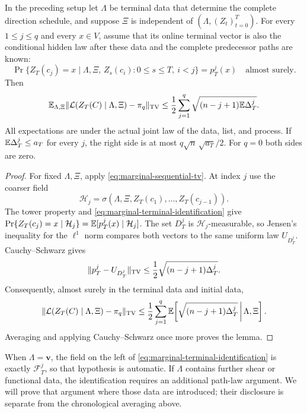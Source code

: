 \begin{lemma}
\label{shear:lem:tuple}
In the preceding setup let $\Lambda$ be terminal data that
determine the complete direction schedule, and suppose $\Xi$ is
independent of $(\Lambda,(Z_t)_{t=0}^T)$. For every
$1\le j\le q$ and every $x\in V$, assume
that its online terminal vector is also the conditional hidden
law after these data and the complete predecessor paths are known:
\begin{equation}\label{eq:marginal-terminal-identification}
 \Pr\{Z_T(c_j)=x\mid
       \Lambda,\Xi,\,
       Z_s(c_i):0\le s\le T,\ i<j\}
 =p_T^j(x)\quad\text{almost surely}.
\end{equation}
Then
\begin{equation}\label{shear:eq:tuple-bound}
 \mathbb E_{\Lambda,\Xi}
 \|\mathcal L(Z_T(C)\mid\Lambda,\Xi)-\pi_q\|_{\mathrm{TV}}
 \le\frac12\sum_{j=1}^q
       \sqrt{(n-j+1)\mathbb E\Delta_T^j}.
\end{equation}
All expectations are under the actual joint law of the data, list,
and process. If $\mathbb E\Delta_T^j\le a_T$ for every $j$, the right
side is at most $q\sqrt n\,\sqrt{a_T}/2$. For $q=0$ both sides are
zero.
\end{lemma}
\begin{proof}
For fixed $\Lambda,\Xi$, apply
\eqref{eq:marginal-sequential-tv}. At index $j$ use the coarser
field
\[
 \mathcal H_j
 =\sigma(\Lambda,\Xi,Z_T(c_1),\ldots,Z_T(c_{j-1})).
\]
The tower property and \eqref{eq:marginal-terminal-identification}
give
$\Pr\{Z_T(c_j)=x\mid\mathcal H_j\}
 =\mathbb E[p_T^j(x)\mid\mathcal H_j]$.
The set $D_T^j$ is $\mathcal H_j$-measurable, so Jensen's
inequality for the $\ell^1$ norm compares both vectors to the
same uniform law $U_{D_T^j}$. Cauchy--Schwarz gives
\[
 \|p_T^j-U_{D_T^j}\|_{\mathrm{TV}}
 \le\frac12\sqrt{(n-j+1)\Delta_T^j}.
\]
Consequently, almost surely in the terminal data and initial data,
\begin{equation}\label{eq:marginal-conditional-tuple}
 \|\mathcal L(Z_T(C)\mid\Lambda,\Xi)-\pi_q\|_{\mathrm{TV}}
 \le\frac12\sum_{j=1}^q
 \mathbb E\!\left[\sqrt{(n-j+1)\Delta_T^j}\,\middle|\,\Lambda,\Xi\right].
\end{equation}
Averaging and applying Cauchy--Schwarz once more proves the lemma.
\end{proof}

When $\Lambda=\mathbf v$, the field on the left of
\eqref{eq:marginal-terminal-identification} is exactly
$\mathcal F_T^j$, so that hypothesis is automatic. If $\Lambda$
contains further shear or functional data, the identification
requires an additional path-law argument. We will prove that
argument where those data are introduced; their disclosure is
separate from the chronological averaging above.

